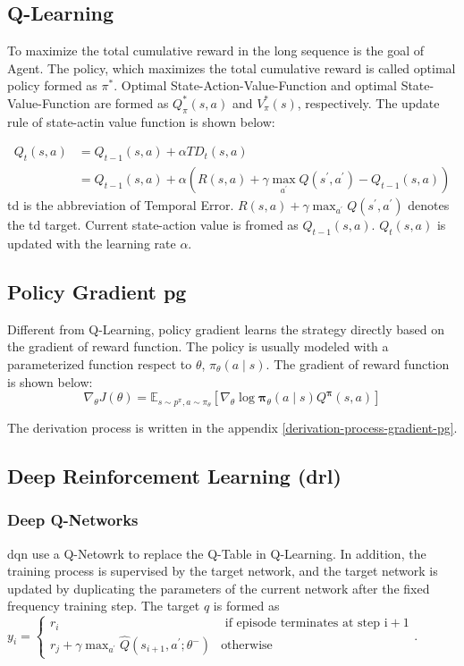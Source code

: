 \subsection{Q-Learning}
To maximize the total cumulative reward in the long sequence is the goal of Agent. The policy, which maximizes the total cumulative reward is called optimal policy formed as $\pi^*$. Optimal State-Action-Value-Function and optimal State-Value-Function are formed as $Q_\pi^*(s, a)$ and $V_\pi^*(s)$, respectively. The update rule of state-actin value function is shown below:

\begin{equation}
\begin{aligned}
Q_t(s, a) &= Q_{t-1}(s, a) + \alpha TD_t(s, a) \\
					&= Q_{t-1}(s, a)+\alpha\left(R(s, a)+\gamma \max _{a^{\prime}} Q\left(s^{\prime}, a^{\prime}\right)-Q_{t-1}(s, a)\right)
\end{aligned}
\end{equation}
\gls{td} is the abbreviation of Temporal Error. $R(s, a)+\gamma \max _{a^{\prime}} Q\left(s^{\prime}, a^{\prime}\right)$ denotes the \gls{td} target. Current state-action value is fromed as $Q_{t-1}(s, a)$. $Q_t(s, a)$ is updated with the learning rate $\alpha$.

\subsection{Policy Gradient \gls{pg}}
Different from Q-Learning, policy gradient learns the strategy directly based on the gradient of reward function. The policy is usually modeled with a parameterized function respect to $\theta$, $\pi_\theta \left(a \mid s\right)$. The gradient of reward function is shown below:
\begin{equation}
\nabla_{\theta} J(\theta)=\mathbb{E}_{s \sim p^{\pi}, a \sim \pi_{\theta}}\left[\nabla_{\theta} \log \boldsymbol{\pi}_{\theta}(a \mid s) Q^{\boldsymbol{\pi}}(s, a)\right]
\end{equation}

The derivation process is written in the appendix \ref{derivation-process-gradient-pg}.

\subsection{Deep Reinforcement Learning (\gls{drl})}
\subsubsection{Deep Q-Networks}
\gls{dqn} use a Q-Netowrk to replace the Q-Table in Q-Learning. In addition, the training process is supervised by the target network, and the target network is updated by duplicating the parameters of the current network after the fixed frequency training step. The target $q$ is formed as $y_{i}=\left\{\begin{array}{cc}r_{i} & \text { if episode terminates at step } \mathrm{i}+1 \\ r_{j}+\gamma \max _{a^{\prime}} \hat{Q}\left(s_{i+1}, a^{\prime} ; \theta^{-}\right) & \text {otherwise }\end{array}\right.$.

